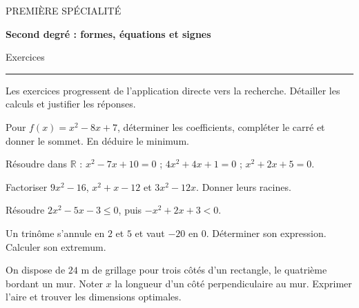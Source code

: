 \documentclass[11pt,a4paper]{article}
\begin{document}
{\small\color{Blue}PREMIÈRE SPÉCIALITÉ}\par{\LARGE\bfseries Second degré : formes, équations et signes}\par{\large Exercices}\par\vspace{0.2cm}\hrule\vspace{0.4cm}
Les exercices progressent de l’application directe vers la recherche. Détailler les calculs et justifier les réponses.
\par\noindent\begin{minipage}{\linewidth}
Pour $f(x)=x^2-8x+7$, déterminer les coefficients, compléter le carré et donner le sommet. En déduire le minimum.
\end{minipage}\par
\par\noindent\begin{minipage}{\linewidth}
Résoudre dans $\mathbb R$ : $x^2-7x+10=0$ ; $4x^2+4x+1=0$ ; $x^2+2x+5=0$.
\end{minipage}\par
\par\noindent\begin{minipage}{\linewidth}
Factoriser $9x^2-16$, $x^2+x-12$ et $3x^2-12x$. Donner leurs racines.
\end{minipage}\par
\par\noindent\begin{minipage}{\linewidth}
Résoudre $2x^2-5x-3\le0$, puis $-x^2+2x+3<0$.
\end{minipage}\par
\par\noindent\begin{minipage}{\linewidth}
Un trinôme s’annule en $2$ et $5$ et vaut $-20$ en $0$. Déterminer son expression. Calculer son extremum.
\end{minipage}\par
\par\noindent\begin{minipage}{\linewidth}
On dispose de $24$ m de grillage pour trois côtés d’un rectangle, le quatrième bordant un mur. Noter $x$ la longueur d’un côté perpendiculaire au mur. Exprimer l’aire et trouver les dimensions optimales.
\end{minipage}\par
\end{document}
